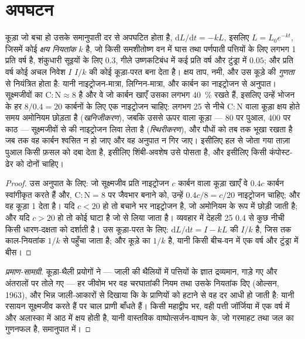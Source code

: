 \section{अपघटन}

\begin{theorem}[कूड़े का क्षय और कार्बन-से-नाइट्रोजन अनुपात]\label{thm:b2:living-soil:decay}
कूड़ा जो बचा हो उसके समानुपाती दर से अपघटित होता है,
$\mathrm{d}L/\mathrm{d}t = -kL$, इसलिए $L = L_0 e^{-kt}$, जिसमें कोई
\emph{क्षय नियतांक} $k$ है, जो किसी समशीतोष्ण वन में घास तथा
पर्णपाती पत्तियों के लिए लगभग 1 प्रति वर्ष है, शंकुधारी सूइयों के लिए $0.3$,
गीले उष्णकटिबंध में कई प्रति वर्ष और टुंड्रा में $0.05$;
और प्रति वर्ष कोई अचल निवेश $I$ $I/k$ की कोई कूड़ा-परत बना देता है। क्षय
ताप, नमी, और उस कूड़े की \emph{गुणता} से नियंत्रित होता है:
यानी नाइट्रोजन-मात्रा, लिग्निन-मात्रा, और
कार्बन का नाइट्रोजन से अनुपात। सूक्ष्मजीवों का $\mathrm{C:N} \approx 8$ है और वे
जो कार्बन खाएँ उसका लगभग \qty{40}{\%} रखते हैं, इसलिए उन्हें भोजन के हर
$8/0.4 = 20$ कार्बनों के लिए एक नाइट्रोजन चाहिए: लगभग 25 से नीचे $\mathrm{C:N}$ वाला
कूड़ा क्षय होते समय अमोनियम छोड़ता है
(\emph{खनिजीकरण}), जबकि उससे ऊपर वाला कूड़ा --- 80 पर पुआल,
400 पर काठ --- सूक्ष्मजीवों से  की नाइट्रोजन लिवा लेता है
(\emph{स्थिरीकरण}), और पौधों को तब तक भूखा रखता है जब तक वह कार्बन
श्वसित न हो जाए और वह अनुपात न गिर जाए। इसीलिए हल से जोता गया ताज़ा
पुआल किसी फ़सल को दबा देता है, इसीलिए शिंबी-अवशेष उसे पोसता है,
और इसीलिए किसी कंपोस्ट-ढेर को दोनों चाहिए।
\end{theorem}
\begin{proof}
उस अनुपात के लिए: जो सूक्ष्मजीव प्रति नाइट्रोजन $c$ कार्बन वाला कूड़ा खाएँ
वे $0.4c$ कार्बन स्वांगीकृत करते हैं और, $\mathrm{C:N} = 8$ पर
जैवभार बनाने को, उन्हें $0.4c/8 = c/20$ नाइट्रोजन चाहिए; और वह कूड़ा
1 देता है। यदि $c < 20$ हो तो बचाने भर नाइट्रोजन है, जो अमोनियम के रूप में
छोड़ी जाती है; और यदि $c > 20$ हो तो कोई घाटा है जो  से लिया जाता है।
व्यवहार में देहली 25 0.4 से कुछ नीची किसी
धारण-दक्षता को दर्शाती है। उस कूड़ा-परत के लिए: $\mathrm{d}L/\mathrm{d}t = I - kL$
की  $I/k$ है, जिस तक काल-नियतांक $1/k$ से पहुँचा जाता है; और
कूड़े का  $1/k$ है, यानी किसी बीच-वन में एक वर्ष और
टुंड्रा में बीस।
\end{proof}
\begin{proof}[प्रमाण-सामग्री]
कूड़ा-थैली प्रयोगों ने --- जाली की थैलियों में पत्तियों के ज्ञात द्रव्यमान,
गाड़े गए और अंतरालों पर तोले गए --- हर जीवोम भर वह चरघातांकी नियम तथा
उसके नियतांक दिए (ओल्सन, 1963), और भिन्न जाली-आकारों से दिखाया
कि  के प्राणियों को हटाने से वह दर आधी हो जाती है:
यानी रसायन सूक्ष्मजीव करते हैं पर चाल प्राणी बाँधते हैं।
किसी महाद्वीप भर, वही पत्ती जॉर्जिया में एक वर्ष में और
अलास्का में आठ में क्षय होती है, यानी वास्तविक वाष्पोत्सर्जन-वाष्पन के,
जो गरमाहट तथा जल का गुणनफल है, समानुपात में।
\end{proof}

